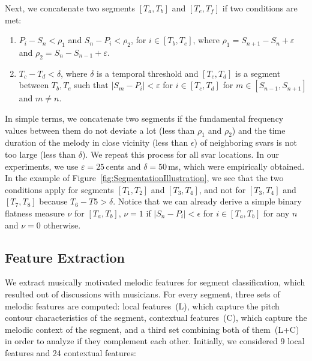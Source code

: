 {Next, we concatenate two segments $[T_a,T_b]$ and $[T_e,T_f]$ if two conditions are met:
\begin{enumerate}
	\item $P_i-S_n < \rho_1$ and $S_n-P_i < \rho_2$, for $i\in[T_b,T_e]$, where $\rho_1 = S_{n+1}-S_n + \varepsilon$ and $\rho_2 = S_n-S_{n-1} + \varepsilon$. 
	\item $T_c-T_d < \delta$, where $\delta$ is a temporal threshold and $[T_c,T_d]$ is a segment between $T_b, T_e$ such that $\vert S_m-P_i\vert <\varepsilon$ for $i\in[T_c,T_d]$ for $m\in [S_{n-1}, S_{n+1}]$ and $m \neq n$.
\end{enumerate}
In simple terms, we concatenate two segments if the fundamental frequency values between them do not deviate a lot (less than $\rho_1$ and $\rho_2$) and the time duration of the melody in close vicinity (less than $\epsilon$) of neighboring svars is not too large (less than $\delta$). We repeat this process for all svar locations. In our experiments, we use $\varepsilon = 25$\,cents and $\delta=50$\,ms, which were empirically obtained. In the example of Figure~\ref{fig:SegmentationIllustration}, we see that the two conditions apply for segments $[T_1,T_2]$ and $[T_3,T_4]$, and not for $[T_3,T_4]$ and $[T_7,T_8]$ because $T_6-T5>\delta$. Notice that we can already derive a simple binary flatness measure $\nu$ for $[T_a, T_b]$, $\nu=1$ if $\vert S_n-P_i \vert< \epsilon$ for $i \in [T_a, T_b]$ for any $n$ and $\nu=0$ otherwise. 

\subsection{Feature Extraction}
\label{sec:features}

We extract musically motivated melodic features for segment classification, which resulted out of discussions with musicians. For every segment, three sets of melodic features are computed: local features~(L), which capture the pitch contour characteristics of the segment, contextual features~(C), which capture the melodic context of the segment, and a third set combining both of them~(L+C) in order to analyze if they complement each other. Initially, we considered 9 local features and 24 contextual features:

}
